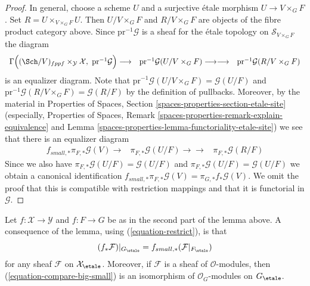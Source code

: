 \begin{proof}
\medskip\noindent
In general, choose a scheme $U$ and a surjective \'etale morphism
$U \to V \times_G F$. Set $R = U \times_{V \times_G F} U$. Then
$U/V \times_G F$ and $R/V \times_G F$ are objects of the fibre
product category above. Since $\text{pr}^{-1}\mathcal{G}$ is a
sheaf for the \'etale topology on $\mathcal{S}_{V \times_G F}$
the diagram
$$
\begin{array}{ccc}\Gamma\Big(
(\Sch/V)_{fppf} \times_{\mathcal{Y}} \mathcal{X},
\ \text{pr}^{-1}\mathcal{G}\Big)
\longrightarrow & \text{pr}^{-1}\mathcal{G}(U/V \times_G F) \longrightarrow\longrightarrow & \text{pr}^{-1}\mathcal{G}(R/V \times_G F)\end{array}
$$
is an equalizer diagram. Note that
$\text{pr}^{-1}\mathcal{G}(U/V \times_G F) = \mathcal{G}(U/F)$
and $\text{pr}^{-1}\mathcal{G}(R/V \times_G F) = \mathcal{G}(R/F)$
by the definition of pullbacks. Moreover, by the material in
Properties of Spaces, Section \ref{spaces-properties-section-etale-site}
(especially,
Properties of Spaces,
Remark \ref{spaces-properties-remark-explain-equivalence} and
Lemma \ref{spaces-properties-lemma-functoriality-etale-site})
we see that there is an equalizer diagram
$$
\begin{array}{ccc}f_{small, *}\pi_{F, *}\mathcal{G}(V)
\longrightarrow & \pi_{F, *}\mathcal{G}(U/F) \longrightarrow\longrightarrow & \pi_{F, *}\mathcal{G}(R/F)\end{array}
$$
Since we also have $\pi_{F, *}\mathcal{G}(U/F) = \mathcal{G}(U/F)$
and $\pi_{F, *}\mathcal{G}(U/F) = \mathcal{G}(U/F)$
we obtain a canonical identification
$f_{small, *}\pi_{F, *}\mathcal{G}(V) = \pi_{G, *}f_*\mathcal{G}(V)$.
We omit the proof that this is compatible with restriction mappings
and that it is functorial in $\mathcal{G}$.
\end{proof}

Let $f : \mathcal{X} \to \mathcal{Y}$ and $f : F \to G$ be as in the
second part of the lemma above. A consequence of the lemma, using
(\ref{equation-restrict}), is that
\begin{equation}
\label{equation-compare-big-small}
(f_*\mathcal{F})|_{G_\etale} =
f_{small, *}(\mathcal{F}|_{F_\etale})
\end{equation}
for any sheaf $\mathcal{F}$ on $\mathcal{X}_\etale$.
Moreover, if $\mathcal{F}$ is a sheaf of $\mathcal{O}$-modules, then
(\ref{equation-compare-big-small}) is an isomorphism of
$\mathcal{O}_G$-modules on $G_\etale$.

